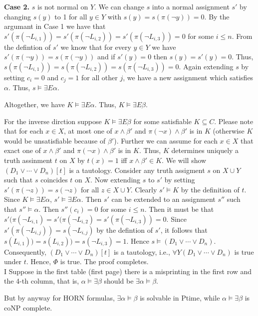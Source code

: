 \documentclass[12pt]{article}
\begin{document}
{\bf Case 2.}  $s$ is not normal on $Y$. We can change $s$ into a normal assignment $s'$ by changing $s(y)$ to 1 for all $y\in Y$ with $s(y)=s(\pi(\neg y))=0$. 
By the argumant in Case 1 we have that $s'(\pi(\neg L_{i,1}))=s'(\pi(\neg L_{i,2}))=s'(\pi(\neg L_{i,3}))=0$ for some $i\leq n$. From the defintion of $s'$ we know that for every $y\in Y$ we have $s'(\pi(\neg y))=s(\pi(\neg y))$ and if $s'(y)=0$ then $s(y)=s'(y)=0$. Thus, $s(\pi(\neg L_{i,1}))=s(\pi(\neg L_{i,2}))=s(\pi(\neg L_{i,3}))=0$. Again extending $s$ by setting $c_i=0$ and $c_j=1$ for all other $j$, we have a new assignment which satisfies $\alpha$. Thus, $s\models\exists E\alpha$. 

Altogether, we have
$K\models\exists E\alpha$. Thus, $K\models\exists E\beta$. 


For the inverse dirction suppose $K\models \exists E\beta$ for some satisfiable $K\subseteq C$. Please note that for each $x\in X$, at most one of $x\wedge \beta'$ and $\pi(\neg x)\wedge\beta'$ is in $K$ (otherwise $K$ would be unsatisfiable because of $\beta'$). 
Further we can assume for each $x\in X$ that exact one of $x\wedge \beta'$ and $\pi(\neg x)\wedge\beta'$ is in $K$. Thus, $K$ determines uniquely a truth assinment $t$ on $X$ by $t(x)=1$ iff $x\wedge \beta'\in K$. We will show $(D_1\vee\cdots\vee D_n)[t]$ is a tautology. Consider any truth assigment $s$ on $X\cup Y$ such that $s$ coincides $t$ on $X$. Now extending $s$ to $s'$ by setting $s'(\pi(\neg z))=s(\neg z)$ for all $z\in X\cup Y$. Clearly $s'\models K$ by the definition of $t$. 
Since $K\models\exists E\alpha$, $s'\models \exists E\alpha$. 
Then $s'$ can be extended to an assignment $s''$ such that $s''\models \alpha$. Then $s''(c_i)=0$ for some $i\leq n$. 
Then it must be that $s'(\pi(\neg L_{i,1})=s'(\pi(\neg L_{i,2})=s'(\pi(\neg L_{i,3}))=0$. Since $s'(\pi(\neg L_{i,j}))=s(\neg L_{i,j})$ by the defintion of $s'$, it follows that $s(L_{i,1}))=s( L_{i,2}))=s(\neg L_{i,3})=1$. Hence $s\models  (D_1\vee\cdots\vee D_n)$. Consequently, $(D_1\vee\cdots\vee D_n)[t]$ is a tautology, i.e., $\forall Y(D_1\vee\cdots\vee D_n)$ is true under $t$. Hence, $\Phi$ is true. The proof completes.\\




\color{red}
I Suppose in the first table (first page) there is a misprinting in the first row and the 4-th column, that is, $\alpha\models\exists \beta$ should be $\exists \alpha\models \beta$. 

But by anyway for HORN formulas, $\exists \alpha\models \beta$ is solvable in Ptime, while $\alpha\models\exists \beta$ is coNP complete.\\
\color{black}
\end{document}
